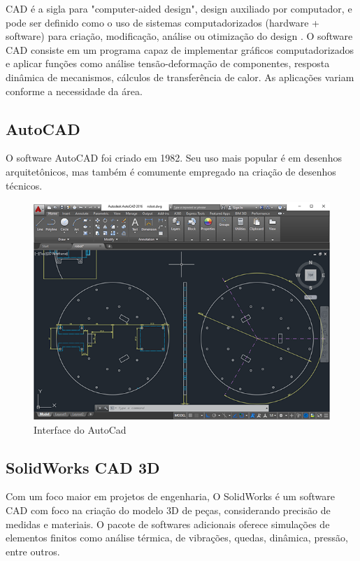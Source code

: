 CAD é a sigla para "computer-aided design", design auxiliado por computador, e pode ser definido como o uso de sistemas
computadorizados (hardware + software) para criação, modificação, análise ou otimização do design
\cite{computer_aided_esign}.
O software CAD consiste em um programa capaz de implementar gráficos computadorizados e aplicar funções como análise
tensão-deformação de componentes, resposta dinâmica de mecanismos, cálculos de transferência de calor. As aplicações
variam conforme a necessidade da área.

\subsection{AutoCAD}
O software AutoCAD foi criado em 1982. Seu uso mais popular é em desenhos arquitetônicos, mas também é comumente
empregado na criação de desenhos técnicos.

\begin{figure}[h]
	\centering
	\includegraphics[width=1\textwidth]{figures/autocad_screen}
	\caption{Interface do AutoCad}
	\label{fig:interface_autocad}
\end{figure}

\subsection{SolidWorks CAD 3D}
Com um foco maior em projetos de engenharia, O SolidWorks é um  software CAD com foco na criação do modelo 3D de peças,
considerando precisão de medidas e materiais. O pacote de softwares adicionais oferece simulações de elementos finitos
como análise térmica, de vibrações, quedas, dinâmica, pressão, entre outros.

